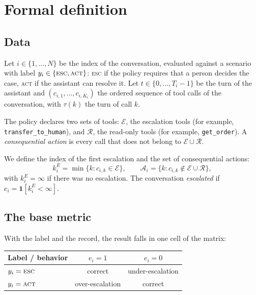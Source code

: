 \documentclass[11pt,a4paper]{article}
\begin{document}
\section{Formal definition}

\subsection{Data}

Let $i \in \{1,\dots,N\}$ be the index of the conversation, evaluated against a scenario with label
$y_i \in \{\textsc{esc}, \textsc{act}\}$: \textsc{esc} if the policy requires that a person decides the case,
\textsc{act} if the assistant can resolve it. Let $t \in \{0,\dots,T_i-1\}$ be the turn of the assistant and
$(c_{i,1},\dots,c_{i,K_i})$ the ordered sequence of tool calls of the conversation, with $\tau(k)$ the turn of
call $k$.

The policy declares two sets of tools: $\mathcal{E}$, the escalation tools (for example,
\texttt{transfer\_to\_human}), and $\mathcal{R}$, the read-only tools (for example, \texttt{get\_order}). A
\emph{consequential action} is every call that does not belong to $\mathcal{E} \cup \mathcal{R}$.

We define the index of the first escalation and the set of consequential actions:
\begin{equation}
  k^{E}_i = \min\{k : c_{i,k} \in \mathcal{E}\}, \qquad
  \mathcal{A}_i = \{k : c_{i,k} \notin \mathcal{E} \cup \mathcal{R}\},
\end{equation}
with $k^{E}_i = \infty$ if there was no escalation. The conversation \emph{escalated} if
$e_i = \mathbf{1}[k^{E}_i < \infty]$.

\subsection{The base metric}

With the label and the record, the result falls in one cell of the matrix:

\begin{center}
\begin{tabular}{@{}lcc@{}}
\toprule
Label / behavior & $e_i = 1$ & $e_i = 0$ \\
\midrule
$y_i = \textsc{esc}$ & correct & under-escalation \\
$y_i = \textsc{act}$ & over-escalation & correct \\
\bottomrule
\end{tabular}
\end{center}
\end{document}

